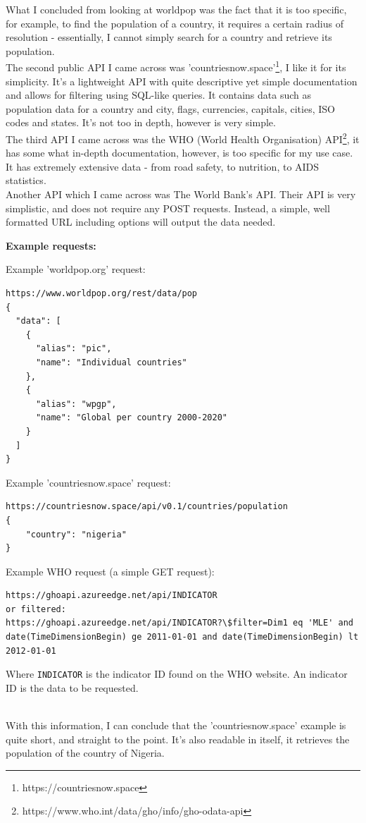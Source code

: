What I concluded from looking at worldpop was the fact that it is too specific, for example, to find the population of a country, it requires a certain radius of resolution - essentially, I cannot simply search for a country and retrieve its population. \\
\newpage
The second public API I came across was 'countriesnow.space'\footnote{https://countriesnow.space}, I like it for its simplicity. It's a lightweight API with quite descriptive yet simple documentation and allows for filtering using SQL-like queries. It contains data such as population data for a country and city, flags, currencies, capitals, cities, ISO codes and states. It's not too in depth, however is very simple. \\
The third API I came across was the WHO (World Health Organisation) API\footnote{https://www.who.int/data/gho/info/gho-odata-api}, it has some what in-depth documentation, however, is too specific for my use case. It has extremely extensive data - from road safety, to nutrition, to AIDS statistics. \\
Another API which I came across was The World Bank's API. Their API is very simplistic, and does not require any POST requests. Instead, a simple, well formatted URL including options will output the data needed.

\textbf{Example requests:}

Example 'worldpop.org' request:
\begin{small}
\begin{lstlisting}[basicstyle=\footnotesize]
https://www.worldpop.org/rest/data/pop
{
  "data": [
    {
      "alias": "pic",
      "name": "Individual countries"
    },
    {
      "alias": "wpgp",
      "name": "Global per country 2000-2020"
    }
  ]
}
\end{lstlisting}

Example 'countriesnow.space' request:
\begin{lstlisting}[basicstyle=\footnotesize]
https://countriesnow.space/api/v0.1/countries/population
{
	"country": "nigeria"
}
\end{lstlisting}

Example WHO request (a simple GET request):
\begin{lstlisting}[basicstyle=\footnotesize]
https://ghoapi.azureedge.net/api/INDICATOR
or filtered:
https://ghoapi.azureedge.net/api/INDICATOR?\$filter=Dim1 eq 'MLE' and date(TimeDimensionBegin) ge 2011-01-01 and date(TimeDimensionBegin) lt 2012-01-01
\end{lstlisting}

Where \verb|INDICATOR| is the indicator ID found on the WHO website. An indicator ID is the data to be requested.
\end{small} \\
\newpage
With this information, I can conclude that the 'countriesnow.space' example is quite short, and straight to the point. It's also readable in itself, it retrieves the population of the country of Nigeria.


